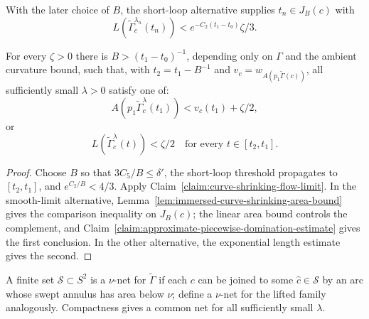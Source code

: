 \begin{remark}
\label{rem:short-loop-length-bound}
\label{xicomp}

With the later choice of $B$, the short-loop alternative supplies
$t_n\in J_B(c)$ with
\[
L(\widetilde\Gamma_c^{\lambda_n}(t_n))
<e^{-C_2(t_1-t_0)}\zeta/3.
\]
\end{remark}

\begin{lemma}
\label{lem:curve-deformation-single-point-estimate}
\label{xistronger}
For every $\zeta>0$ there is $B>(t_1-t_0)^{-1}$, depending only on $\Gamma$
and the ambient curvature bound, such that, with $t_2=t_1-B^{-1}$ and
$v_c=w_{A(p_1\widetilde\Gamma(c))}$, all sufficiently small $\lambda>0$
satisfy one of:
\[
A(p_1\widetilde\Gamma_c^\lambda(t_1))<v_c(t_1)+\zeta/2,
\]
or
\[
L(\widetilde\Gamma_c^\lambda(t))<\zeta/2
\quad\text{for every }t\in[t_2,t_1].
\]
\end{lemma}
\begin{proof}
\sketch Choose $B$ so that $3C_5/B\le\delta'$, the short-loop threshold propagates to
$[t_2,t_1]$, and $e^{C_2/B}<4/3$. Apply
Claim~\ref{claim:curve-shrinking-flow-limit}. In the smooth-limit alternative,
Lemma~\ref{lem:immersed-curve-shrinking-area-bound} gives the comparison
inequality on $J_B(c)$; the linear area bound controls the complement, and
Claim~\ref{claim:approximate-piecewise-domination-estimate} gives the first
conclusion. In the other alternative, the exponential length estimate gives
the second.
\end{proof}

A finite set ${\mathcal S}\subset S^2$ is a $\nu$-net for
$\widetilde\Gamma$ if each $c$ can be joined to some $\hat c\in{\mathcal S}$
by an arc whose swept annulus has area below $\nu$; define a $\nu$-net for the
lifted family analogously. Compactness gives a common net for all sufficiently
small $\lambda$.

